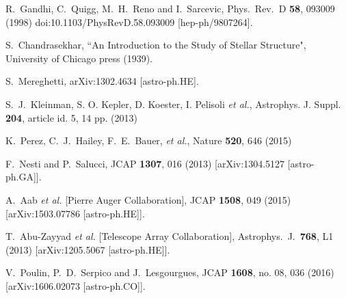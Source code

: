   R.~Gandhi, C.~Quigg, M.~H.~Reno and I.~Sarcevic,
  Phys.\ Rev.\ D {\bf 58}, 093009 (1998)
  doi:10.1103/PhysRevD.58.093009
  [hep-ph/9807264].


S.~Chandrasekhar, ``An Introduction to the Study of Stellar Structure", University of Chicago press (1939).

  S.~Mereghetti,
  arXiv:1302.4634 [astro-ph.HE].


S.~J.~Kleinman, S. O. Kepler, D. Koester, I. Pelisoli  {\it et al.}, Astrophys. J. Suppl. {\bf 204}, article
id. 5, 14 pp. (2013)

K.~Perez, C.~J.~Hailey, F.~E.~Bauer, {\it et al.}, Nature {\bf 520}, 646 (2015)

  F.~Nesti and P.~Salucci,
  JCAP {\bf 1307}, 016 (2013)
  [arXiv:1304.5127 [astro-ph.GA]].


  A.~Aab {\it et al.} [Pierre Auger Collaboration],
  JCAP {\bf 1508}, 049 (2015)
  [arXiv:1503.07786 [astro-ph.HE]].


  T.~Abu-Zayyad {\it et al.} [Telescope Array Collaboration],
  Astrophys.\ J.\  {\bf 768}, L1 (2013)
  [arXiv:1205.5067 [astro-ph.HE]].


  V.~Poulin, P.~D.~Serpico and J.~Lesgourgues,
  JCAP {\bf 1608}, no. 08, 036 (2016)
  [arXiv:1606.02073 [astro-ph.CO]].


